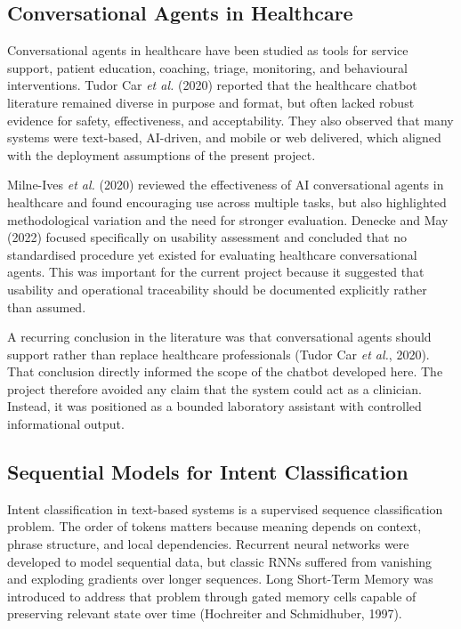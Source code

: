 \subsection{Conversational Agents in Healthcare}

Conversational agents in healthcare have been studied as tools for service support, patient education, coaching, triage, monitoring, and behavioural interventions. Tudor Car \textit{et al.} (2020) reported that the healthcare chatbot literature remained diverse in purpose and format, but often lacked robust evidence for safety, effectiveness, and acceptability. They also observed that many systems were text-based, AI-driven, and mobile or web delivered, which aligned with the deployment assumptions of the present project.

Milne-Ives \textit{et al.} (2020) reviewed the effectiveness of AI conversational agents in healthcare and found encouraging use across multiple tasks, but also highlighted methodological variation and the need for stronger evaluation. Denecke and May (2022) focused specifically on usability assessment and concluded that no standardised procedure yet existed for evaluating healthcare conversational agents. This was important for the current project because it suggested that usability and operational traceability should be documented explicitly rather than assumed.

A recurring conclusion in the literature was that conversational agents should support rather than replace healthcare professionals (Tudor Car \textit{et al.}, 2020). That conclusion directly informed the scope of the chatbot developed here. The project therefore avoided any claim that the system could act as a clinician. Instead, it was positioned as a bounded laboratory assistant with controlled informational output.

\subsection{Sequential Models for Intent Classification}

Intent classification in text-based systems is a supervised sequence classification problem. The order of tokens matters because meaning depends on context, phrase structure, and local dependencies. Recurrent neural networks were developed to model sequential data, but classic RNNs suffered from vanishing and exploding gradients over longer sequences. Long Short-Term Memory was introduced to address that problem through gated memory cells capable of preserving relevant state over time (Hochreiter and Schmidhuber, 1997).

